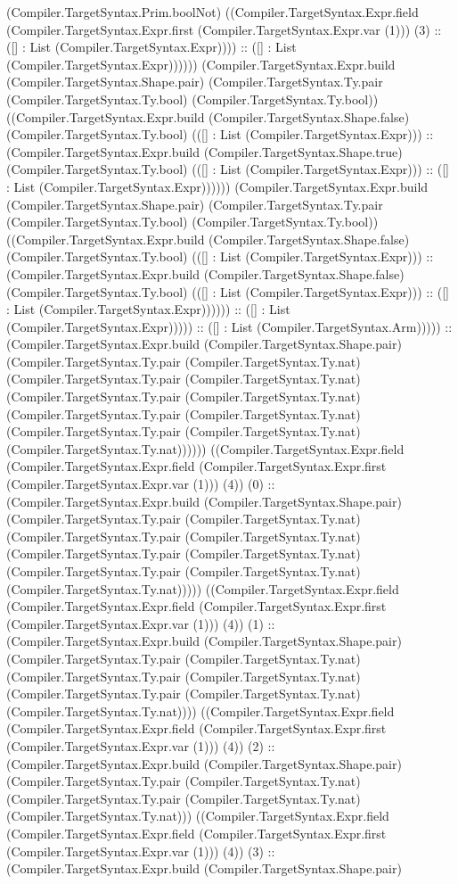\documentclass[11pt]{article}
\begin{document}
(Compiler.TargetSyntax.Prim.boolNot) ((Compiler.TargetSyntax.Expr.field (Compiler.TargetSyntax.Expr.first (Compiler.TargetSyntax.Expr.var (1))) (3) :: ([] : List (Compiler.TargetSyntax.Expr)))) :: ([] : List (Compiler.TargetSyntax.Expr)))))) (Compiler.TargetSyntax.Expr.build (Compiler.TargetSyntax.Shape.pair) (Compiler.TargetSyntax.Ty.pair (Compiler.TargetSyntax.Ty.bool) (Compiler.TargetSyntax.Ty.bool)) ((Compiler.TargetSyntax.Expr.build (Compiler.TargetSyntax.Shape.false) (Compiler.TargetSyntax.Ty.bool) (([] : List (Compiler.TargetSyntax.Expr))) :: (Compiler.TargetSyntax.Expr.build (Compiler.TargetSyntax.Shape.true) (Compiler.TargetSyntax.Ty.bool) (([] : List (Compiler.TargetSyntax.Expr))) :: ([] : List (Compiler.TargetSyntax.Expr)))))) (Compiler.TargetSyntax.Expr.build (Compiler.TargetSyntax.Shape.pair) (Compiler.TargetSyntax.Ty.pair (Compiler.TargetSyntax.Ty.bool) (Compiler.TargetSyntax.Ty.bool)) ((Compiler.TargetSyntax.Expr.build (Compiler.TargetSyntax.Shape.false) (Compiler.TargetSyntax.Ty.bool) (([] : List (Compiler.TargetSyntax.Expr))) :: (Compiler.TargetSyntax.Expr.build (Compiler.TargetSyntax.Shape.false) (Compiler.TargetSyntax.Ty.bool) (([] : List (Compiler.TargetSyntax.Expr))) :: ([] : List (Compiler.TargetSyntax.Expr)))))) :: ([] : List (Compiler.TargetSyntax.Expr))))) :: ([] : List (Compiler.TargetSyntax.Arm))))) :: (Compiler.TargetSyntax.Expr.build (Compiler.TargetSyntax.Shape.pair) (Compiler.TargetSyntax.Ty.pair (Compiler.TargetSyntax.Ty.nat) (Compiler.TargetSyntax.Ty.pair (Compiler.TargetSyntax.Ty.nat) (Compiler.TargetSyntax.Ty.pair (Compiler.TargetSyntax.Ty.nat) (Compiler.TargetSyntax.Ty.pair (Compiler.TargetSyntax.Ty.nat) (Compiler.TargetSyntax.Ty.pair (Compiler.TargetSyntax.Ty.nat) (Compiler.TargetSyntax.Ty.nat)))))) ((Compiler.TargetSyntax.Expr.field (Compiler.TargetSyntax.Expr.field (Compiler.TargetSyntax.Expr.first (Compiler.TargetSyntax.Expr.var (1))) (4)) (0) :: (Compiler.TargetSyntax.Expr.build (Compiler.TargetSyntax.Shape.pair) (Compiler.TargetSyntax.Ty.pair (Compiler.TargetSyntax.Ty.nat) (Compiler.TargetSyntax.Ty.pair (Compiler.TargetSyntax.Ty.nat) (Compiler.TargetSyntax.Ty.pair (Compiler.TargetSyntax.Ty.nat) (Compiler.TargetSyntax.Ty.pair (Compiler.TargetSyntax.Ty.nat) (Compiler.TargetSyntax.Ty.nat))))) ((Compiler.TargetSyntax.Expr.field (Compiler.TargetSyntax.Expr.field (Compiler.TargetSyntax.Expr.first (Compiler.TargetSyntax.Expr.var (1))) (4)) (1) :: (Compiler.TargetSyntax.Expr.build (Compiler.TargetSyntax.Shape.pair) (Compiler.TargetSyntax.Ty.pair (Compiler.TargetSyntax.Ty.nat) (Compiler.TargetSyntax.Ty.pair (Compiler.TargetSyntax.Ty.nat) (Compiler.TargetSyntax.Ty.pair (Compiler.TargetSyntax.Ty.nat) (Compiler.TargetSyntax.Ty.nat)))) ((Compiler.TargetSyntax.Expr.field (Compiler.TargetSyntax.Expr.field (Compiler.TargetSyntax.Expr.first (Compiler.TargetSyntax.Expr.var (1))) (4)) (2) :: (Compiler.TargetSyntax.Expr.build (Compiler.TargetSyntax.Shape.pair) (Compiler.TargetSyntax.Ty.pair (Compiler.TargetSyntax.Ty.nat) (Compiler.TargetSyntax.Ty.pair (Compiler.TargetSyntax.Ty.nat) (Compiler.TargetSyntax.Ty.nat))) ((Compiler.TargetSyntax.Expr.field (Compiler.TargetSyntax.Expr.field (Compiler.TargetSyntax.Expr.first (Compiler.TargetSyntax.Expr.var (1))) (4)) (3) :: (Compiler.TargetSyntax.Expr.build (Compiler.TargetSyntax.Shape.pair) 
\end{document}
